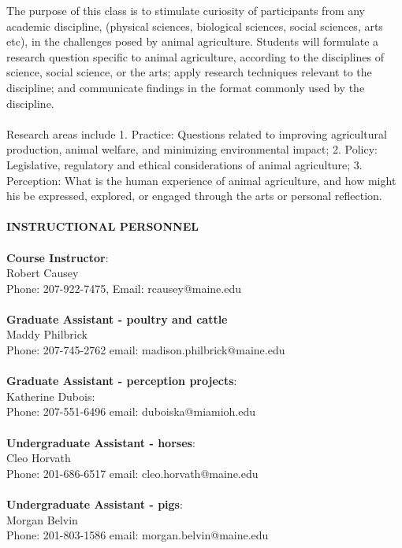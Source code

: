 \documentclass[11pt]{article}
\begin{document}
The purpose of this class is to stimulate curiosity of participants from any academic discipline, (physical sciences, biological sciences, social sciences, arts etc), in the challenges posed by animal agriculture. Students will formulate a research question specific to animal agriculture, according to the disciplines of science, social science, or the arts; apply research techniques relevant to the discipline; and communicate findings in the format commonly used by the discipline. \\~\\
Research areas include 1. Practice: Questions related to improving agricultural production, animal welfare, and minimizing environmental impact; 2. Policy: Legislative, regulatory and ethical considerations of animal agriculture; 3. Perception: What is the human experience of animal agriculture, and how might his be expressed, explored, or engaged through the arts or personal reflection.\\~\\
\newpage
\noindent \textbf{INSTRUCTIONAL PERSONNEL}\\~\\
\textbf{Course Instructor}:\\
Robert Causey\\
Phone: 207-922-7475,  Email: rcausey@maine.edu\\~\\
\textbf{Graduate Assistant - poultry and cattle}\\
Maddy Philbrick \\
Phone: 207-745-2762  email: madison.philbrick@maine.edu\\~\\
\textbf{Graduate Assistant - perception projects}:\\
Katherine Dubois:\\
Phone: 207-551-6496 email: duboiska@miamioh.edu\\~\\
\textbf{Undergraduate Assistant - horses}:\\
Cleo Horvath\\
Phone: 201-686-6517  email: cleo.horvath@maine.edu\\~\\
\textbf{Undergraduate Assistant - pigs}:\\
Morgan Belvin\\
Phone: 201-803-1586  email: morgan.belvin@maine.edu\\~\\
\end{document}
